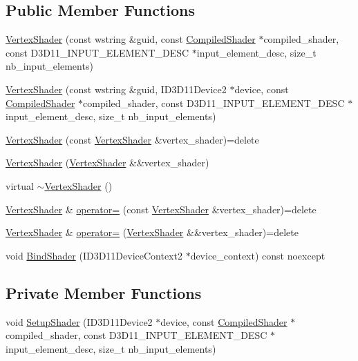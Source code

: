 \subsection*{Public Member Functions}
\begin{DoxyCompactItemize}
\item 
\hyperlink{classmage_1_1_vertex_shader_abd7b008391aecafcab640a0b7c4259d1}{Vertex\+Shader} (const wstring \&guid, const \hyperlink{structmage_1_1_compiled_shader}{Compiled\+Shader} $\ast$compiled\+\_\+shader, const D3\+D11\+\_\+\+I\+N\+P\+U\+T\+\_\+\+E\+L\+E\+M\+E\+N\+T\+\_\+\+D\+E\+SC $\ast$input\+\_\+element\+\_\+desc, size\+\_\+t nb\+\_\+input\+\_\+elements)
\item 
\hyperlink{classmage_1_1_vertex_shader_aea99d88bc2a471452703c13b1c043681}{Vertex\+Shader} (const wstring \&guid, I\+D3\+D11\+Device2 $\ast$device, const \hyperlink{structmage_1_1_compiled_shader}{Compiled\+Shader} $\ast$compiled\+\_\+shader, const D3\+D11\+\_\+\+I\+N\+P\+U\+T\+\_\+\+E\+L\+E\+M\+E\+N\+T\+\_\+\+D\+E\+SC $\ast$input\+\_\+element\+\_\+desc, size\+\_\+t nb\+\_\+input\+\_\+elements)
\item 
\hyperlink{classmage_1_1_vertex_shader_a713f8581278ea2e5eb3010207b7e42a8}{Vertex\+Shader} (const \hyperlink{classmage_1_1_vertex_shader}{Vertex\+Shader} \&vertex\+\_\+shader)=delete
\item 
\hyperlink{classmage_1_1_vertex_shader_adb9497fa9e712c3b7c94d377408c24f3}{Vertex\+Shader} (\hyperlink{classmage_1_1_vertex_shader}{Vertex\+Shader} \&\&vertex\+\_\+shader)
\item 
virtual \hyperlink{classmage_1_1_vertex_shader_aa475ad31613dd20fdcc4930409fd0cfd}{$\sim$\+Vertex\+Shader} ()
\item 
\hyperlink{classmage_1_1_vertex_shader}{Vertex\+Shader} \& \hyperlink{classmage_1_1_vertex_shader_a0094f5c2adb8377fa5c8d52e7a65136f}{operator=} (const \hyperlink{classmage_1_1_vertex_shader}{Vertex\+Shader} \&vertex\+\_\+shader)=delete
\item 
\hyperlink{classmage_1_1_vertex_shader}{Vertex\+Shader} \& \hyperlink{classmage_1_1_vertex_shader_ada6250a89610e5649e0062c9a50fb78a}{operator=} (\hyperlink{classmage_1_1_vertex_shader}{Vertex\+Shader} \&\&vertex\+\_\+shader)=delete
\item 
void \hyperlink{classmage_1_1_vertex_shader_a04001136e86576cefff14b6a6d79c2d4}{Bind\+Shader} (I\+D3\+D11\+Device\+Context2 $\ast$device\+\_\+context) const noexcept
\end{DoxyCompactItemize}
\subsection*{Private Member Functions}
\begin{DoxyCompactItemize}
\item 
void \hyperlink{classmage_1_1_vertex_shader_a4ddc010c355523fee4f04930bd0285ed}{Setup\+Shader} (I\+D3\+D11\+Device2 $\ast$device, const \hyperlink{structmage_1_1_compiled_shader}{Compiled\+Shader} $\ast$compiled\+\_\+shader, const D3\+D11\+\_\+\+I\+N\+P\+U\+T\+\_\+\+E\+L\+E\+M\+E\+N\+T\+\_\+\+D\+E\+SC $\ast$input\+\_\+element\+\_\+desc, size\+\_\+t nb\+\_\+input\+\_\+elements)
\end{DoxyCompactItemize}
